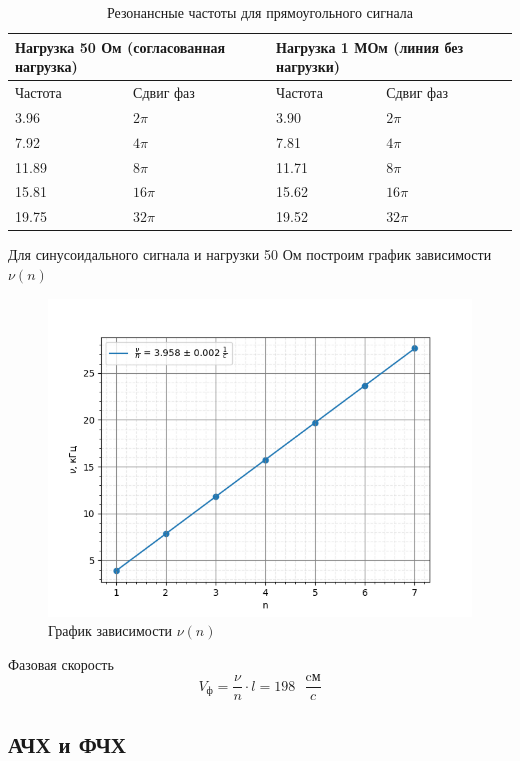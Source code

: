 \documentclass[a4paper,12 pt]{article}
\begin{document}
\begin{table}[H]
    \centering
    \begin{tabular}{|p{2 cm}|p{2 cm}||p{2 cm}|p{2 cm}|}
    \hline
    \multicolumn{2}{|p{4 cm}||}{Нагрузка 50 Ом (согласованная нагрузка)} & \multicolumn{2}{p{2 cm}|}{Нагрузка 1 МОм (линия без нагрузки)} \\
    \hline
    Частота & Сдвиг фаз & Частота & Сдвиг фаз \\
        \hline
    3.96  &  $ 2 \pi$  & 3.90  & $ 2 \pi$\\
\hline
7.92  &  $ 4 \pi$  & 7.81  & $ 4 \pi$\\
\hline
11.89  &  $ 8 \pi$  & 11.71  & $ 8 \pi$\\
\hline
15.81  &  $ 16 \pi$  &  15.62 & $ 16 \pi$ \\
\hline
19.75  &  $ 32 \pi$  & 19.52  & $ 32 \pi$ \\
\hline
    \end{tabular}
    \caption{Резонансные частоты для прямоугольного сигнала}
\end{table}


Для синусоидального сигнала и нагрузки 50 Ом построим график зависимости $\nu(n)$
\begin{figure}[H]
    \centering
    \includegraphics[scale=0.7]{f(n) 50.png}
    \caption{График зависимости $\nu(n)$}
    \label{fig:enter-label}
\end{figure}

Фазовая скорость
\[V_{\text{ф}} = \frac{\nu}{n} \cdot l = 198 \text{ } \frac{\text{cм}}{c}\]

\subsection{АЧХ и ФЧХ}
\end{document}
